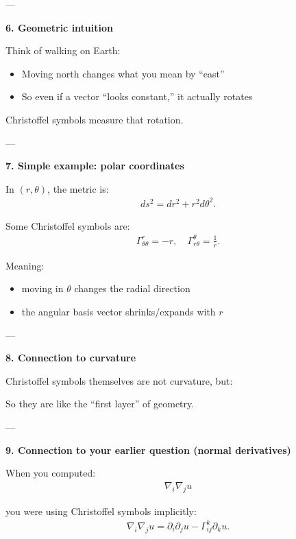 \documentclass[12pt,a4paper]{report}
\begin{document}
\begin{description}
---

\item \textbf{ 6. Geometric intuition}

Think of walking on Earth:

\begin{itemize}
\item Moving north changes what you mean by “east”
\item So even if a vector “looks constant,” it actually rotates
\end{itemize}

Christoffel symbols measure that rotation.

---

\item \textbf{ 7. Simple example: polar coordinates}

In $(r,\theta)$, the metric is:
\begin{align*}
ds^2 = dr^2 + r^2 d\theta^2.
\end{align*}

Some Christoffel symbols are:
\begin{align*}
\Gamma^r_{\theta\theta} = -r, \quad \Gamma^\theta_{r\theta} = \frac{1}{r}.
\end{align*}

Meaning:

\begin{itemize}
\item moving in $\theta$ changes the radial direction
\item the angular basis vector shrinks/expands with $r$
\end{itemize}

---

\item \textbf{ 8. Connection to curvature}

Christoffel symbols themselves are not curvature, but:


So they are like the “first layer” of geometry.

---

\item \textbf{ 9. Connection to your earlier question (normal derivatives)}

When you computed:
\begin{align*}
\nabla_i \nabla_j u
\end{align*}

you were using Christoffel symbols implicitly:
\begin{align*}
\nabla_i \nabla_j u = \partial_i \partial_j u - \Gamma^k_{ij} \partial_k u.
\end{align*}


\end{description}
\end{document}
